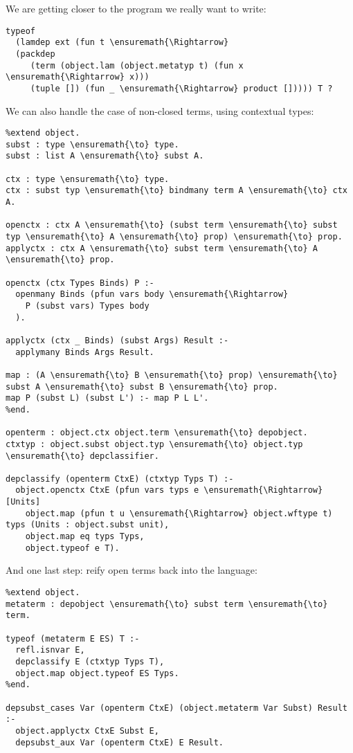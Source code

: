 We are getting closer to the program we really want to write:

\begin{verbatim}
typeof
  (lamdep ext (fun t \ensuremath{\Rightarrow}
  (packdep
     (term (object.lam (object.metatyp t) (fun x \ensuremath{\Rightarrow} x)))
     (tuple []) (fun _ \ensuremath{\Rightarrow} product [])))) T ?
\end{verbatim}

We can also handle the case of non-closed terms, using contextual types:

\begin{verbatim}
%extend object.
subst : type \ensuremath{\to} type.
subst : list A \ensuremath{\to} subst A.

ctx : type \ensuremath{\to} type.
ctx : subst typ \ensuremath{\to} bindmany term A \ensuremath{\to} ctx A.

openctx : ctx A \ensuremath{\to} (subst term \ensuremath{\to} subst typ \ensuremath{\to} A \ensuremath{\to} prop) \ensuremath{\to} prop.
applyctx : ctx A \ensuremath{\to} subst term \ensuremath{\to} A \ensuremath{\to} prop.

openctx (ctx Types Binds) P :-
  openmany Binds (pfun vars body \ensuremath{\Rightarrow}
    P (subst vars) Types body
  ).

applyctx (ctx _ Binds) (subst Args) Result :-
  applymany Binds Args Result.

map : (A \ensuremath{\to} B \ensuremath{\to} prop) \ensuremath{\to} subst A \ensuremath{\to} subst B \ensuremath{\to} prop.
map P (subst L) (subst L') :- map P L L'.
%end.

openterm : object.ctx object.term \ensuremath{\to} depobject.
ctxtyp : object.subst object.typ \ensuremath{\to} object.typ \ensuremath{\to} depclassifier.

depclassify (openterm CtxE) (ctxtyp Typs T) :-
  object.openctx CtxE (pfun vars typs e \ensuremath{\Rightarrow} [Units]
    object.map (pfun t u \ensuremath{\Rightarrow} object.wftype t) typs (Units : object.subst unit),
    object.map eq typs Typs,
    object.typeof e T).
\end{verbatim}

And one last step: reify open terms back into the language:

\begin{verbatim}
%extend object.
metaterm : depobject \ensuremath{\to} subst term \ensuremath{\to} term.

typeof (metaterm E ES) T :-
  refl.isnvar E,
  depclassify E (ctxtyp Typs T),
  object.map object.typeof ES Typs.
%end.

depsubst_cases Var (openterm CtxE) (object.metaterm Var Subst) Result :-
  object.applyctx CtxE Subst E,
  depsubst_aux Var (openterm CtxE) E Result.
\end{verbatim}

